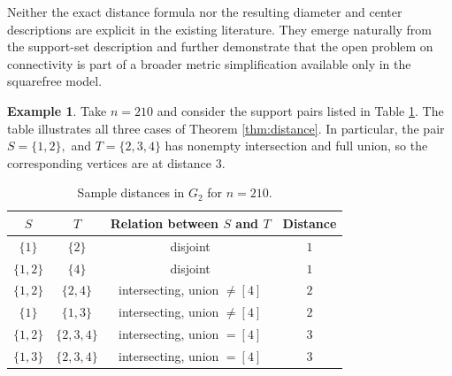 \documentclass[12pt]{article}
\theoremstyle{definition}
\newtheorem{example}[theorem]{Example}
\begin{document}
	 Neither the exact distance formula nor the resulting diameter and center descriptions are explicit in the existing literature.  They emerge naturally from the support-set description and further demonstrate that the open problem on connectivity is part of a broader metric simplification available only in the squarefree model.
	
	\begin{example}\label{ex:dist210}
		Take $n=210$ and consider the support pairs listed in Table \ref{tab:distanceexamples}. The table illustrates all three cases of Theorem \ref{thm:distance}. In particular, the pair $ S=\{1,2\},$ and $ T=\{2,3,4\} $ has nonempty intersection and full union, so the corresponding vertices are at distance $3$.
	\end{example}
	
	\begin{table}[H]
		\centering
		\caption{Sample distances in $G_2$ for $n=210$.}
		\label{tab:distanceexamples}
		\begin{tabular}{cccc}
			\toprule
			$S$ & $T$ & Relation between $S$ and $T$ & Distance \\
			\midrule
			$\{1\}$ & $\{2\}$ & disjoint & $1$ \\
			$\{1,2\}$ & $\{4\}$ & disjoint & $1$ \\
			$\{1,2\}$ & $\{2,4\}$ & intersecting, union $\neq [4]$ & $2$ \\
			$\{1\}$ & $\{1,3\}$ & intersecting, union $\neq [4]$ & $2$ \\
			$\{1,2\}$ & $\{2,3,4\}$ & intersecting, union $=[4]$ & $3$ \\
			$\{1,3\}$ & $\{2,3,4\}$ & intersecting, union $=[4]$ & $3$ \\
			\bottomrule
		\end{tabular}
	\end{table}
	
\end{document}
